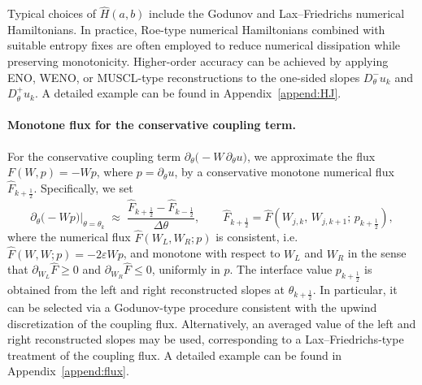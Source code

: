 \documentclass[11pt, dina4, amsfont12]{article}
\begin{document}
Typical choices of $\widehat{H}(a,b)$ include the Godunov and
Lax--Friedrichs numerical Hamiltonians. 
In practice, Roe-type numerical
Hamiltonians combined with suitable entropy fixes are often employed to reduce
numerical dissipation while preserving monotonicity. 
Higher-order accuracy can
be achieved by applying ENO, WENO, or MUSCL-type reconstructions to the one-sided
slopes $D_\theta^- u_k$ and $D_\theta^+ u_k$. 
A detailed example can be found in
Appendix~\ref{append:HJ}.


\paragraph{Monotone flux for the conservative coupling term.}
For the conservative coupling term
$\partial_\theta\!\bigl(- W\,\partial_\theta u\bigr)$,
we approximate the flux
$F(W,p)=- W p$, where $p=\partial_\theta u$, by a conservative
monotone numerical flux $\widehat F_{k+\frac12}$. Specifically, we set
\[
\partial_\theta\!\bigl(- W p\bigr)\Big|_{\theta=\theta_k}
\;\approx\;
\frac{\widehat F_{k+\frac12}-\widehat F_{k-\frac12}}{\Delta\theta},
\qquad
\widehat F_{k+\frac12}
=
\widehat F\!\left(W_{j,k},\,W_{j,k+1};\,p_{k+\frac12}\right),
\]
where the numerical flux $\widehat F(W_L,W_R;p)$ is consistent, i.e. $\widehat F(W,W;p) = -2\varepsilon W p$,
and monotone with respect to $W_L$ and $W_R$ in the sense that
$\partial_{W_L}\widehat F \ge 0$ and $\partial_{W_R}\widehat F \le 0$,
uniformly in $p$.
The interface value $p_{k+\frac12}$ is obtained from the left and right
reconstructed slopes at $\theta_{k+\frac12}$. In particular, it can be selected
via a Godunov-type procedure consistent with the upwind discretization of the
coupling flux. Alternatively, an averaged value of the left and right
reconstructed slopes may be used, corresponding to a Lax--Friedrichs-type
treatment of the coupling flux.
A detailed example can be found in
Appendix~\ref{append:flux}.
\end{document}
